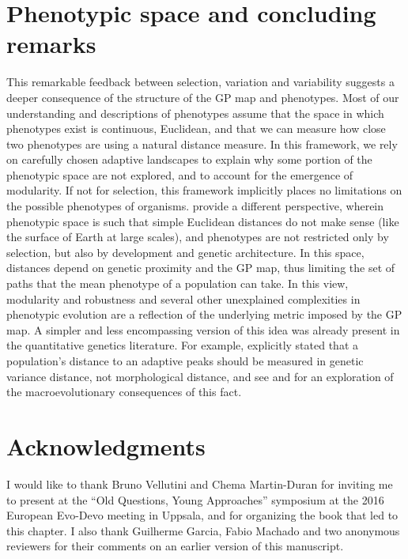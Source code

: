 \begin{refsection}
\section{Phenotypic space and concluding remarks}

This remarkable feedback between selection, variation and variability
suggests a deeper consequence of the structure of the GP map and
phenotypes. Most of our understanding and descriptions of phenotypes
assume that the space in which phenotypes exist is continuous,
Euclidean, and that we can measure how close two phenotypes are using a
natural distance measure. In this framework, we rely on carefully chosen
adaptive landscapes to explain why some portion of the phenotypic space
are not explored, and to account for the emergence of modularity. If not
for selection, this framework implicitly places no limitations on the
possible phenotypes of organisms. \textcite{Stadler2001-vt} provide a different
perspective, wherein phenotypic space is such that simple Euclidean
distances do not make sense (like the surface of Earth at large scales),
and phenotypes are not restricted only by selection, but also by
development and genetic architecture. In this space, distances depend on
genetic proximity and the GP map, thus limiting the set of paths that
the mean phenotype of a population can take. In this view, modularity
and robustness and several other unexplained complexities in phenotypic
evolution are a reflection of the underlying metric imposed by the GP
map. A simpler and less encompassing version of this idea was already
present in the quantitative genetics literature. For example,
\textcite{Lande1979-by} explicitly stated that a population's distance to an
adaptive peaks should be measured in genetic variance distance, not
morphological distance, and see \textcite{Steppan2002-be} and \textcite{Melo2016-yw} for an
exploration of the macroevolutionary consequences of this fact.

\section{Acknowledgments}

I would like to thank Bruno Vellutini and Chema Martin-Duran for inviting me to present at the ``Old Questions, Young Approaches'' symposium at the 2016 European Evo-Devo meeting in Uppsala, and for organizing the book that led to this chapter. I also thank Guilherme Garcia, Fabio Machado and two anonymous reviewers for their comments on an earlier version of this manuscript.

\printbibliography

\end{refsection}

